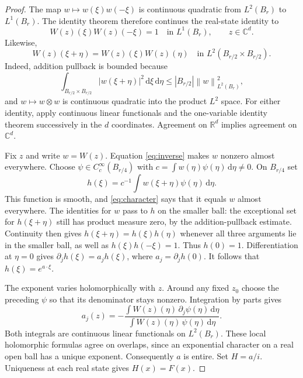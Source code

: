 \documentclass[11pt,a4paper]{article}
\theoremstyle{remark}
\newcommand{\R}{\mathbb R}
\newcommand{\C}{\mathbb C}
\newcommand{\dd}{\,\mathrm d}
\newcommand{\norm}[1]{\left\lVert#1\right\rVert}
\begin{document}
\begin{proof}
The map $w\mapsto w(\xi)w(-\xi)$ is continuous quadratic from
$L^2(B_r)$ to $L^1(B_r)$. The identity theorem therefore continues
the real-state identity to
\begin{equation}\label{eq:inverse}
 W(z)(\xi)W(z)(-\xi)=1
 \quad\text{in }L^1(B_r),\qquad z\in\C^d.
\end{equation}
Likewise,
\begin{equation}\label{eq:character}
 W(z)(\xi+\eta)=W(z)(\xi)W(z)(\eta)
 \quad\text{in }L^2(B_{r/2}\times B_{r/2}).
\end{equation}
Indeed, addition pullback is bounded because
\[
 \int_{B_{r/2}\times B_{r/2}}|w(\xi+\eta)|^2\dd\xi\dd\eta
 \le |B_{r/2}|\norm{w}_{L^2(B_r)}^2 ,
\]
and $w\mapsto w\otimes w$ is continuous quadratic into the product
$L^2$ space. For either identity, apply continuous linear functionals
and the one-variable identity theorem successively in the $d$
coordinates. Agreement on $\R^d$ implies agreement on $\C^d$.

Fix $z$ and write $w=W(z)$. Equation \eqref{eq:inverse} makes $w$
nonzero almost everywhere. Choose $\psi\in C_c^\infty(B_{r/4})$ with
$c=\int w(\eta)\psi(\eta)\dd\eta\ne0$. On $B_{r/4}$ set
\[
 h(\xi)=c^{-1}\int w(\xi+\eta)\psi(\eta)\dd\eta .
\]
This function is smooth, and \eqref{eq:character} says that it equals
$w$ almost everywhere. The identities for $w$ pass to $h$ on the
smaller ball: the exceptional set for $h(\xi+\eta)$ still has product
measure zero, by the addition-pullback estimate. Continuity then gives
$h(\xi+\eta)=h(\xi)h(\eta)$ whenever all three arguments lie in the
smaller ball, as well as $h(\xi)h(-\xi)=1$. Thus $h(0)=1$.
Differentiation at $\eta=0$ gives
$\partial_jh(\xi)=a_jh(\xi)$, where $a_j=\partial_jh(0)$.
It follows that $h(\xi)=e^{a\cdot\xi}$.

The exponent varies holomorphically with $z$. Around any fixed $z_0$
choose the preceding $\psi$ so that its denominator stays nonzero.
Integration by parts gives
\begin{equation}\label{eq:exponent}
 a_j(z)=-
 \frac{\int W(z)(\eta)\,\partial_j\psi(\eta)\dd\eta}
      {\int W(z)(\eta)\,\psi(\eta)\dd\eta}.
\end{equation}
Both integrals are continuous linear functionals on $L^2(B_r)$.
These local holomorphic formulas agree on overlaps, since an
exponential character on a real open ball has a unique exponent.
Consequently $a$ is entire. Set $H=a/i$. Uniqueness at each real
state gives $H(x)=F(x)$.
\end{proof}
\end{document}

